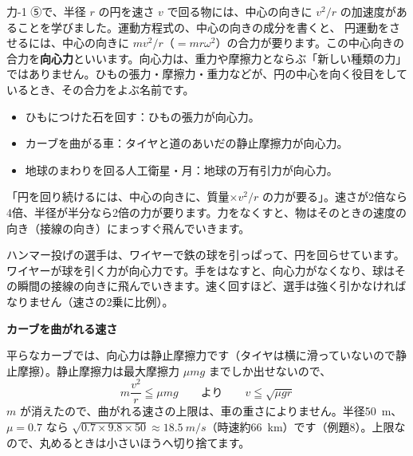 
\leavevmode\label{ph:力-2:sec7}\label{ph:力-2:koushinryoku}力-1 ⑤で、半径 $r$ の円を速さ $v$ で回る物には、中心の向きに $v^2/r$ の加速度があることを学びました。運動方程式の、中心の向きの成分を書くと、
円運動をさせるには、中心の向きに $mv^2/r$（$=mr\omega^2$）の合力が要ります。この中心向きの合力を\textbf{向心力}といいます。向心力は、重力や摩擦力とならぶ「新しい種類の力」ではありません。ひもの張力・摩擦力・重力などが、円の中心を向く役目をしているとき、その合力をよぶ名前です。

\begin{itemize}[leftmargin=1.2\zw, itemsep=2pt, topsep=2pt, label={\color{bkTheme}●}]
\item ひもにつけた石を回す：ひもの張力が向心力。
\item カーブを曲がる車：タイヤと道のあいだの静止摩擦力が向心力。
\item 地球のまわりを回る人工衛星・月：地球の万有引力が向心力。
\end{itemize}

\begin{phyomi}[$mv^2/r=F_{\text{中心}}$]
「円を回り続けるには、中心の向きに、質量×$v^2/r$ の力が要る」。速さが2倍なら4倍、半径が半分なら2倍の力が要ります。力をなくすと、物はそのときの速度の向き（接線の向き）にまっすぐ飛んでいきます。
\end{phyomi}
\begin{phmijika}[ハンマー投げ]
ハンマー投げの選手は、ワイヤーで鉄の球を引っぱって、円を回らせています。ワイヤーが球を引く力が向心力です。手をはなすと、向心力がなくなり、球はその瞬間の接線の向きに飛んでいきます。速く回すほど、選手は強く引かなければなりません（速さの2乗に比例）。
\end{phmijika}

\noindent\textbf{カーブを曲がれる速さ}\par
\noindent 平らなカーブでは、向心力は静止摩擦力です（タイヤは横に滑っていないので静止摩擦）。静止摩擦力は最大摩擦力 $\mu mg$ までしか出せないので、
\[ m\frac{v^2}{r}\leqq\mu mg\qquad\text{より}\qquad v\leqq\sqrt{\mu gr} \]
$m$ が消えたので、曲がれる速さの上限は、車の重さによりません。半径\qty{50}{m}、$\mu=0.7$ なら $\sqrt{0.7\times9.8\times50}\approx\qty{18.5}{m/s}$（時速約\qty{66}{km}）です（例題8）。上限なので、丸めるときは小さいほうへ切り捨てます。

